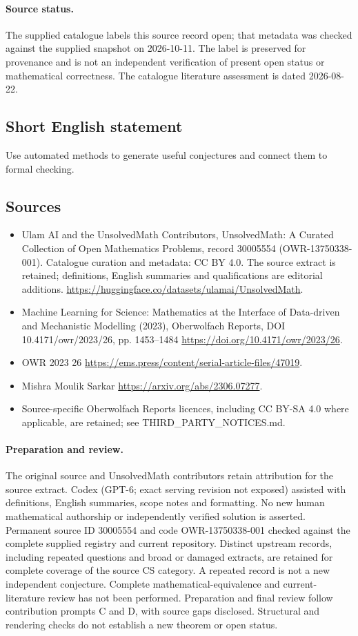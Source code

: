 \documentclass[11pt]{article}
\begin{document}
\paragraph{Source status.}
The supplied catalogue labels this source record open; that metadata was checked against the supplied snapshot on 2026-10-11. The label is preserved for provenance and is not an independent verification of present open status or mathematical correctness. The catalogue literature assessment is dated 2026-08-22.
\subsection{Short English statement}
Use automated methods to generate useful conjectures and connect them to formal checking.
\subsection{Sources}
\begin{itemize}
\item[S1] Ulam AI and the UnsolvedMath Contributors, UnsolvedMath: A Curated Collection of Open Mathematics Problems, record 30005554 (OWR-13750338-001). Catalogue curation and metadata: CC BY 4.0. The source extract is retained; definitions, English summaries and qualifications are editorial additions.
\url{https://huggingface.co/datasets/ulamai/UnsolvedMath}.
\item[S2] Machine Learning for Science: Mathematics at the Interface of Data-driven and Mechanistic Modelling (2023), Oberwolfach Reports, DOI 10.4171/owr/2023/26, pp. 1453--1484
\url{https://doi.org/10.4171/owr/2023/26}.
\item[S3] OWR 2023 26
\url{https://ems.press/content/serial-article-files/47019}.
\item[S4] Mishra Moulik Sarkar
\url{https://arxiv.org/abs/2306.07277}.
\item Source-specific Oberwolfach Reports licences, including CC BY-SA 4.0 where applicable, are retained; see THIRD\_PARTY\_NOTICES.md.
\end{itemize}
\paragraph{Preparation and review.}
The original source and UnsolvedMath contributors retain attribution for the source extract. Codex (GPT-6; exact serving revision not exposed) assisted with definitions, English summaries, scope notes and formatting. No new human mathematical authorship or independently verified solution is asserted. Permanent source ID 30005554 and code OWR-13750338-001 checked against the complete supplied registry and current repository. Distinct upstream records, including repeated questions and broad or damaged extracts, are retained for complete coverage of the source CS category. A repeated record is not a new independent conjecture. Complete mathematical-equivalence and current-literature review has not been performed. Preparation and final review follow contribution prompts C and D, with source gaps disclosed. Structural and rendering checks do not establish a new theorem or open status.
\label{end:30005554}
\end{document}
